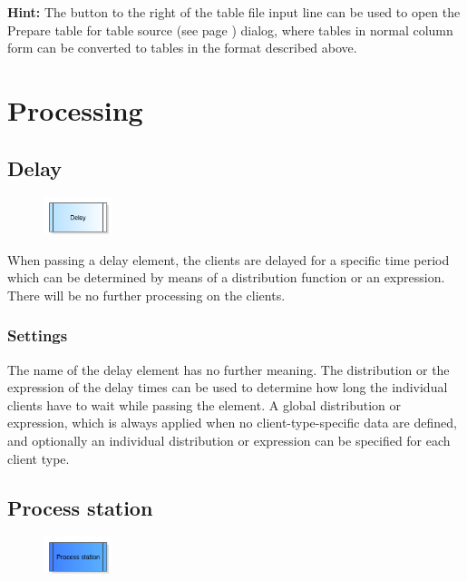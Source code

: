 \textbf{Hint:}
The button to the right of the table file input line can be used to open the 
Prepare table for table source (see page \pageref{ref:ProcessClientTable}) dialog,
where tables in normal column form can be converted to tables in the format described above.





\chapter{Processing}

\section{Delay}
\label{ref:ModelElementDelay}

\begin{figure}
\vspace{-22pt}
\includegraphics[width=2cm]{imageModelElementDelay.png}
\vspace{-22pt}
\end{figure}

When passing a delay element, the clients are delayed for a specific time period which can be determined
 by means of a distribution function or an expression. There will be no further processing on the clients.

\subsection*{Settings}

The name of the delay element has no further meaning. The distribution or the expression of the delay times can be used
to determine how long the individual clients have to wait while passing the element. A global distribution or expression,
which is always applied when no client-type-specific data are defined, and optionally an individual distribution or expression
can be specified for each client type.


\section{Process station}
\label{ref:ModelElementProcess}

\begin{figure}
\vspace{-22pt}
\includegraphics[width=2cm]{imageModelElementProcess.png}
\vspace{-22pt}
\end{figure}

